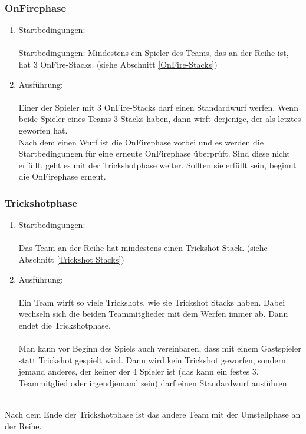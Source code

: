 \documentclass[a5paper, 12pt]{book}
\begin{document}
\subsubsection{OnFirephase}\label{onfirephase}
\begin{enumerate} [(1)]
    \item Startbedingungen:\\\\
    Startbedingungen: Mindestens ein Spieler des Teams, das an der Reihe ist, hat 3 OnFire-Stacks. (siehe Abschnitt \ref{OnFire-Stacks})
    \item Ausführung:\\\\
    Einer der Spieler mit 3 OnFire-Stacks darf 
 einen Standardwurf werfen. Wenn beide Spieler eines Teams 3 Stacks haben, dann wirft derjenige, der als letztes geworfen hat. \\
Nach dem einen Wurf ist die OnFirephase vorbei und es werden die Startbedingungen für eine erneute OnFirephase überprüft. Sind diese nicht erfüllt, geht es mit der Trickshotphase weiter. Sollten sie erfüllt sein, beginnt die OnFirephase erneut.


\end{enumerate}
\subsubsection{Trickshotphase}\label{Trickshotphase}
\begin{enumerate} [(1)]
    \item Startbedingungen:\\\\
    Das Team an der Reihe hat mindestens einen Trickshot Stack. (siehe Abschnitt \ref{Trickshot Stacks})
    \item Ausführung:\\\\
    Ein Team wirft so viele Trickshots, wie sie Trickshot Stacks haben. Dabei wechseln sich die beiden Teammitglieder mit dem Werfen immer ab. Dann endet die Trickshotphase. \\\\
    Man kann vor Beginn des Spiels auch vereinbaren, dass mit einem Gastspieler statt Trickshot gespielt wird. Dann wird kein Trickshot geworfen, sondern jemand anderes, der keiner der 4 Spieler ist (das kann ein festes 3. Teammitglied oder irgendjemand sein) darf einen Standardwurf ausführen.\\\\

\end{enumerate}
Nach dem Ende der Trickshotphase ist das andere Team mit der Umstellphase an der Reihe.
\end{document}
